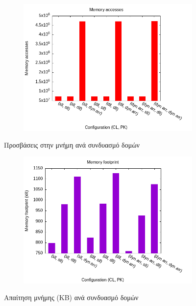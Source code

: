 \documentclass{article}
\begin{document}
\begin{figure}[h]
    \begin{subfigure}{0.4\textwidth}
        
    \end{subfigure}
    \begin{subfigure}{0.6\textwidth}
        \includegraphics[width=\textwidth]{../src/DRR/mem_accesses.png}
    \end{subfigure}
    \caption{Προσβάσεις στην μνήμη ανά συνδυασμό δομών}
    \begin{subfigure}{0.4\textwidth}
        
    \end{subfigure}
    \begin{subfigure}{0.6\textwidth}
        \includegraphics[width=\textwidth]{../src/DRR/mem_footprint.png}
    \end{subfigure}
    \caption{Απαίτηση μνήμης (ΚΒ) ανά συνδυασμό δομών}
\end{figure}
\FloatBarrier
\end{document}
